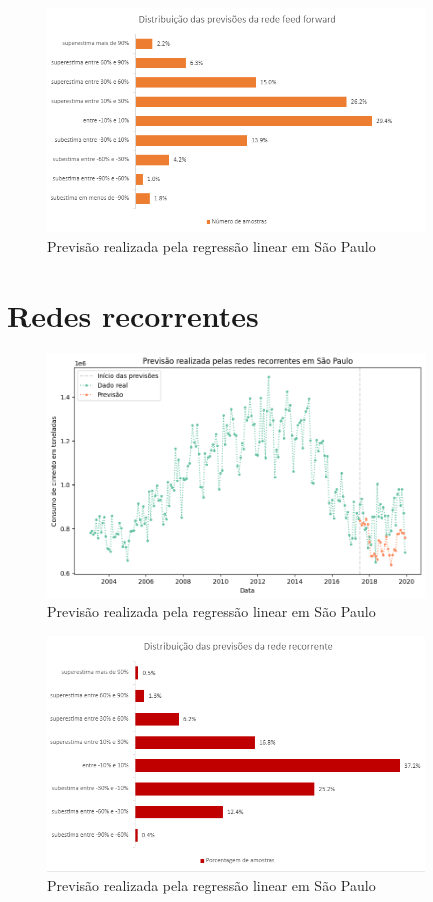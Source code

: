\begin{figure}[H]
    \centering
    \includegraphics[width=10cm]{../figuras/graficos/mlp/erro-perc-mlp.png}
    \caption{Previsão realizada pela regressão linear em São Paulo}
    \label{consumo-sp}
\end{figure}


\section{Redes recorrentes}

\begin{figure}[H]
    \centering
    \includegraphics[width=10cm]{../figuras/graficos/rnn/prev_sp.png}
    \caption{Previsão realizada pela regressão linear em São Paulo}
    \label{consumo-sp}
\end{figure}

\begin{figure}[H]
    \centering
    \includegraphics[width=10cm]{../figuras/graficos/rnn/erro-perc-rnn.png}
    \caption{Previsão realizada pela regressão linear em São Paulo}
    \label{consumo-sp}
\end{figure}


